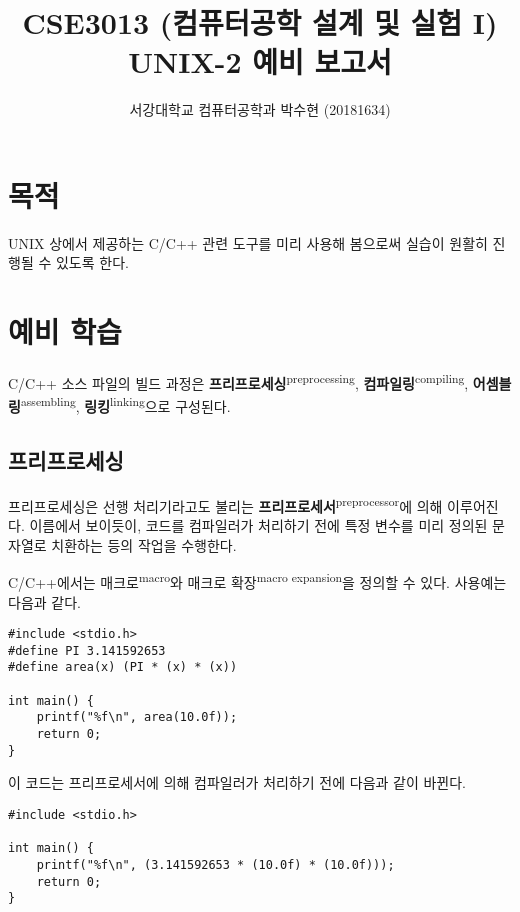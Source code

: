 \documentclass[runningheads]{../../../llncs}
\newcommand{\translation}[1]{\textsuperscript{#1}}
\begin{document}
\title{CSE3013 (컴퓨터공학 설계 및 실험 I) \space \newline UNIX-2 예비 보고서}
\author{서강대학교 컴퓨터공학과 박수현 (20181634)}
\maketitle

\section{목적}
UNIX 상에서 제공하는 C/C++ 관련 도구를 미리 사용해 봄으로써 실습이 원활히 진행될 수 있도록 한다.

\section{예비 학습}
C/C++ 소스 파일의 빌드 과정은 \textbf{프리프로세싱}\translation{preprocessing}, \textbf{컴파일링}\translation{compiling}, \textbf{어셈블링}\translation{assembling}, \textbf{링킹}\translation{linking}으로 구성된다.

\subsection{프리프로세싱}
프리프로세싱은 선행 처리기라고도 불리는 \textbf{프리프로세서}\translation{preprocessor}에 의해 이루어진다. 이름에서 보이듯이, 코드를 컴파일러가 처리하기 전에 특정 변수를 미리 정의된 문자열로 치환하는 등의 작업을 수행한다.

C/C++에서는 매크로\translation{macro}와 매크로 확장\translation{macro expansion}을 정의할 수 있다. 사용예는 다음과 같다.

\begin{verbatim}
#include <stdio.h>
#define PI 3.141592653
#define area(x) (PI * (x) * (x))

int main() {
    printf("%f\n", area(10.0f));
    return 0;
}
\end{verbatim}

이 코드는 프리프로세서에 의해 컴파일러가 처리하기 전에 다음과 같이 바뀐다.

\begin{verbatim}
#include <stdio.h>

int main() {
    printf("%f\n", (3.141592653 * (10.0f) * (10.0f)));
    return 0;
}
\end{verbatim}
\end{document}
